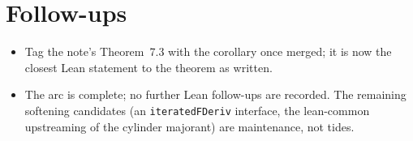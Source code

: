 \documentclass[11pt]{article}
\begin{document}
\section{Follow-ups}

\begin{itemize}
\item Tag the note's Theorem~7.3 with the corollary once merged; it is
now the closest Lean statement to the theorem as written.
\item The arc is complete; no further Lean follow-ups are recorded. The
remaining softening candidates (an \texttt{iteratedFDeriv} interface, the
lean-common upstreaming of the cylinder majorant) are maintenance, not
tides.
\end{itemize}
\end{document}
